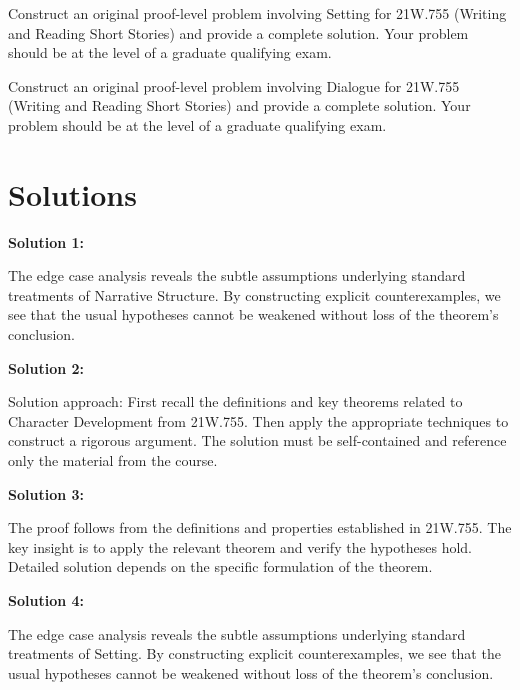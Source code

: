 \documentclass[12pt,a4paper]{exam}
\begin{document}
\begin{questions}
\question[4]
Construct an original proof-level problem involving Setting for 21W.755 (Writing and Reading Short Stories) and provide a complete solution. Your problem should be at the level of a graduate qualifying exam.

\vspace{0.3cm}

\question[5]
Construct an original proof-level problem involving Dialogue for 21W.755 (Writing and Reading Short Stories) and provide a complete solution. Your problem should be at the level of a graduate qualifying exam.

\vspace{0.3cm}

\end{questions}

\newpage
\section*{Solutions}

\textbf{Solution 1:}

The edge case analysis reveals the subtle assumptions underlying standard treatments of Narrative Structure. By constructing explicit counterexamples, we see that the usual hypotheses cannot be weakened without loss of the theorem's conclusion.

\vspace{0.5cm}

\textbf{Solution 2:}

Solution approach: First recall the definitions and key theorems related to Character Development from 21W.755. Then apply the appropriate techniques to construct a rigorous argument. The solution must be self-contained and reference only the material from the course.

\vspace{0.5cm}

\textbf{Solution 3:}

The proof follows from the definitions and properties established in 21W.755. The key insight is to apply the relevant theorem and verify the hypotheses hold. Detailed solution depends on the specific formulation of the theorem.

\vspace{0.5cm}

\textbf{Solution 4:}

The edge case analysis reveals the subtle assumptions underlying standard treatments of Setting. By constructing explicit counterexamples, we see that the usual hypotheses cannot be weakened without loss of the theorem's conclusion.
\end{document}
